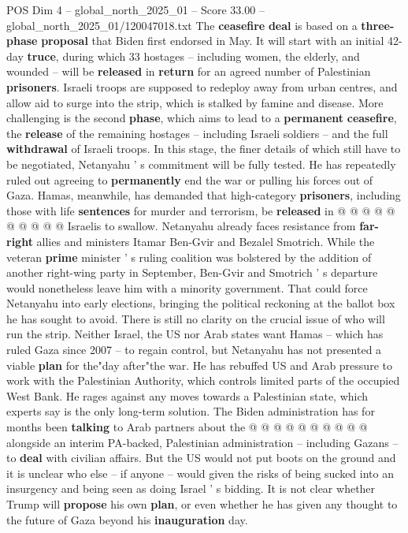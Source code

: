\begin{textsample}{POS Dim 4 – global\_north\_2025\_01 – Score 33.00 – global\_north\_2025\_01/120047018.txt}
The \textbf{ceasefire} \textbf{deal} is based on a \textbf{three-phase} \textbf{proposal} that Biden first endorsed in May.
It will start with an initial 42-day \textbf{truce}, during which 33 hostages -- including women, the elderly, and wounded -- will be \textbf{released} in \textbf{return} for an agreed number of Palestinian \textbf{prisoners}.
Israeli troops are supposed to redeploy away from urban centres, and allow aid to surge into the strip, which is stalked by famine and disease.
More challenging is the second \textbf{phase}, which aims to lead to a \textbf{permanent} \textbf{ceasefire}, the \textbf{release} of the remaining hostages -- including Israeli soldiers -- and the full \textbf{withdrawal} of Israeli troops.
In this stage, the finer details of which still have to be negotiated, Netanyahu ' s commitment will be fully tested.
He has repeatedly ruled out agreeing to \textbf{permanently} end the war or pulling his forces out of Gaza.
Hamas, meanwhile, has demanded that high-category \textbf{prisoners}, including those with life \textbf{sentences} for murder and terrorism, be \textbf{released} in @ @ @ @ @ @ @ @ @ @ Israelis to swallow.
Netanyahu already faces resistance from \textbf{far-right} allies and ministers Itamar Ben-Gvir and Bezalel Smotrich.
While the veteran \textbf{prime} minister ' s ruling coalition was bolstered by the addition of another right-wing party in September, Ben-Gvir and Smotrich ' s departure would nonetheless leave him with a minority government.
That could force Netanyahu into early elections, bringing the political reckoning at the ballot box he has sought to avoid.
There is still no clarity on the crucial issue of who will run the strip.
Neither Israel, the US nor Arab states want Hamas -- which has ruled Gaza since 2007 -- to regain control, but Netanyahu has not presented a viable \textbf{plan} for the"day after"the war.
He has rebuffed US and Arab pressure to work with the Palestinian Authority, which controls limited parts of the occupied West Bank.
He rages against any moves towards a Palestinian state, which experts say is the only long-term solution.
The Biden administration has for months been \textbf{talking} to Arab partners about the @ @ @ @ @ @ @ @ @ @ alongside an interim PA-backed, Palestinian administration -- including Gazans -- to \textbf{deal} with civilian affairs.
But the US would not put boots on the ground and it is unclear who else -- if anyone -- would given the risks of being sucked into an insurgency and being seen as doing Israel ' s bidding.
It is not clear whether Trump will \textbf{propose} his own \textbf{plan}, or even whether he has given any thought to the future of Gaza beyond his \textbf{inauguration} day.

\end{textsample}
